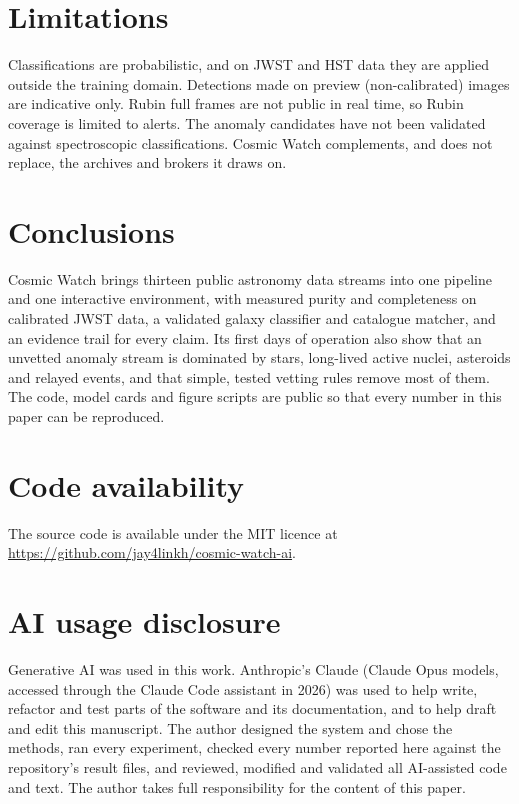 \documentclass[preprint,11pt,authoryear]{elsarticle}
\begin{document}
\section{Limitations}
\label{sec:limits}

Classifications are probabilistic, and on JWST and HST data they are applied
outside the training domain. Detections made on preview (non-calibrated) images
are indicative only. Rubin full frames are not public in real time, so Rubin
coverage is limited to alerts. The anomaly candidates have not been validated
against spectroscopic classifications. Cosmic Watch complements, and does not
replace, the archives and brokers it draws on.

\section{Conclusions}

Cosmic Watch brings thirteen public astronomy data streams into one pipeline and
one interactive environment, with measured purity and completeness on calibrated
JWST data, a validated galaxy classifier and catalogue matcher, and an
evidence trail for every claim. Its first days of operation also show that an
unvetted anomaly stream is dominated by stars, long-lived active nuclei,
asteroids and relayed events, and that simple, tested vetting rules remove most
of them. The code, model cards and figure scripts are public so that every
number in this paper can be reproduced.

\section*{Code availability}

The source code is available under the MIT licence at\\
\url{https://github.com/jay4linkh/cosmic-watch-ai}.

\section*{AI usage disclosure}

Generative AI was used in this work. Anthropic's Claude (Claude Opus models,
accessed through the Claude Code assistant in 2026) was used to help write,
refactor and test parts of the software and its documentation, and to help
draft and edit this manuscript. The author designed the system and chose the
methods, ran every experiment, checked every number reported here against the
repository's result files, and reviewed, modified and validated all
AI-assisted code and text. The author takes full responsibility for the
content of this paper.
\end{document}
